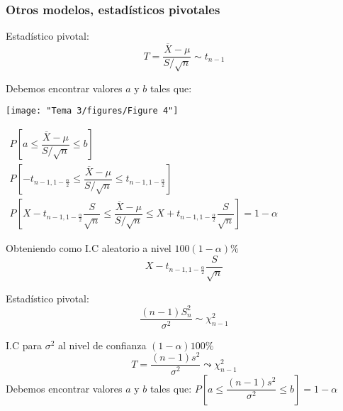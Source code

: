 \subsubsection{Otros modelos, estadísticos pivotales}
 \begin{tcolorbox}[colback=blue!5!white, colframe=blue!75!black, title=\textbf{$X\sim \mathcal{N}(\mu,\sigma^2)$, estimamos $\mu,\sigma$ desconocida}]
Estadístico pivotal: \[
T=\dfrac{\overline{X}-\mu}{S / \sqrt{n} }\sim t_{n-1}
\] 
\end{tcolorbox}

Debemos encontrar valores $a$ y $b$ tales que:

\begin{minipage}{0.45\textwidth}
    \texttt{[image: "Tema 3/figures/Figure 4"]}
\end{minipage}$\begin{array}{l}
    P\left[ a\le \dfrac{\overline{X}-\mu}{S / \sqrt{n} }\le b \right] \\
    P\left[ -t_{n-1,1-\frac{\alpha}{2}}\le \dfrac{\overline{X}-\mu}{S / \sqrt{n} }\le t_{n-1,1-\frac{\alpha}{2} } \right] \\
    P\left[ X-t_{n-1,1-\frac{\alpha}{2} }\dfrac{S}{\sqrt{n} }\le \dfrac{\overline{X}-\mu}{S / \sqrt{n} }\le X+t_{n-1,1-\frac{\alpha}{2} }\dfrac{S}{\sqrt{n} } \right] =1-\alpha
\end{array}$

Obteniendo como I.C aleatorio a nivel $100(1-\alpha)\%$ \[
X-t_{n-1,1-\frac{\alpha}{2} }\dfrac{S}{\sqrt{n} }
\] 
\begin{tcolorbox}[colback=blue!5!white, colframe=blue!75!black, title=\textbf{$X\sim \mathcal{N}(\mu,\sigma^2)$, estimamos $\sigma^2$}]
Estadístico pivotal: \[
\dfrac{(n-1)S_n^2}{\sigma^2}\sim \chi_{n-1}^2
\] 
\end{tcolorbox}
I.C para $\sigma^2$ al nivel de confianza $(1-\alpha)100\%$ \[
T=\dfrac{(n-1)s^2}{\sigma^2}\leadsto \chi_{n-1}^2
\] 
Debemos encontrar valores $a$ y $b$ tales que: $P\left[ a\le \dfrac{(n-1)s^2}{\sigma^2}\le b \right]=1-\alpha $

